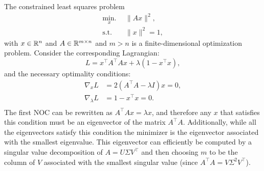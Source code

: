 \begin{example} \label{ex:constlsq}
\theoremstyle{definition}
The constrained least squares problem 
\begin{equation*}
\begin{split}
\underset{x}{\text{min.}} \:\:& \lVert A x \rVert^2, \\
    \text{s.t.}\:\:& \lVert x \rVert^2 = 1,
\end{split}
\end{equation*}
with $x\in \mathbb{R}^n$ and $A \in \mathbb{R}^{m \times n}$ and $m > n$ is a finite-dimensional optimization problem. Consider the corresponding Lagrangian:
\begin{equation*}
L = x^\top  A^\top Ax + \lambda (1 - x^\top x),
\end{equation*}
and the necessary optimality conditions:
\begin{equation*}
\begin{split}
\nabla_x L &= 2(A^\top A - \lambda I)x = 0, \\
\nabla_\lambda L &= 1 - x^\top x = 0. \\
\end{split}
\end{equation*}
The first NOC can be rewritten as $A^\top A x = \lambda x$, and therefore any $x$ that satisfies this condition must be an eigenvector of the matrix $A^\top A$. Additionally, while all the eigenvectors satisfy this condition the minimizer is the eigenvector associated with the smallest eigenvalue.
This eigenvector can efficiently be computed by a singular value decomposition of $A = U\Sigma V^\top $ and then choosing $m$ to be the column of $V$ associated with the smallest singular value (since $A^\top A = V\Sigma^2 V^\top $).
\end{example}

